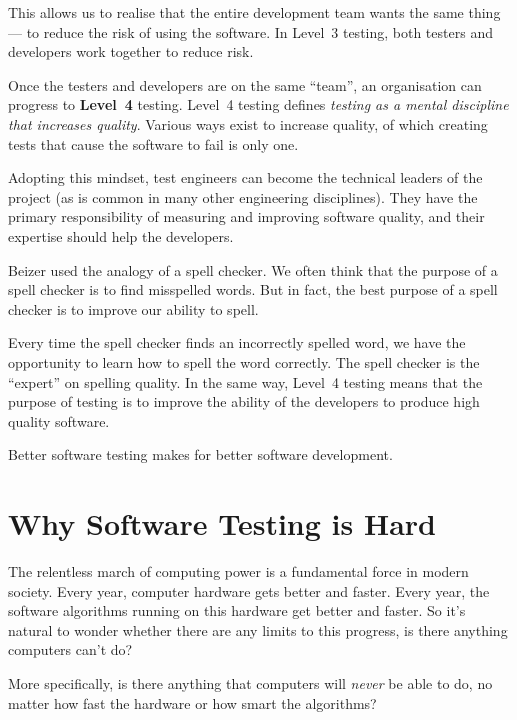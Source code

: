 This allows us to realise that the entire development team wants the same thing
--- to reduce the risk of using the software. In Level~3 testing, both testers
and developers work together to reduce risk.

Once the testers and developers are on the same ``team'', an organisation can
progress to {\bf Level~4} testing. Level~4 testing defines {\it testing as a
mental discipline that increases quality}. Various ways exist to increase
quality, of which creating tests that cause the software to fail is only one.

Adopting this mindset, test engineers can become the technical leaders of the
project (as is common in many other engineering disciplines). They have the
primary responsibility of measuring and improving software quality, and their
expertise should help the developers.

Beizer used the analogy of a spell checker. We often think that the purpose of a
spell checker is to find misspelled words. But in fact, the best purpose of a
spell checker is to improve our ability to spell.

Every time the spell checker finds an incorrectly spelled word, we have the
opportunity to learn how to spell the word correctly.  The spell checker is the
``expert'' on spelling quality. In the same way, Level~4 testing means that the
purpose of testing is to improve the ability of the developers to produce high
quality software.

Better software testing makes for better software development.



\section{Why Software Testing is Hard}


The relentless march of computing power is a fundamental force in modern
society.
%
Every year, computer hardware gets better and faster. Every year, the software
algorithms running on this hardware get better and faster. So it's natural to
wonder whether there are any limits to this progress, is there anything
computers can't do?

More specifically, is there anything that computers will {\it never} be able to
do, no matter how fast the hardware or how smart the algorithms?

